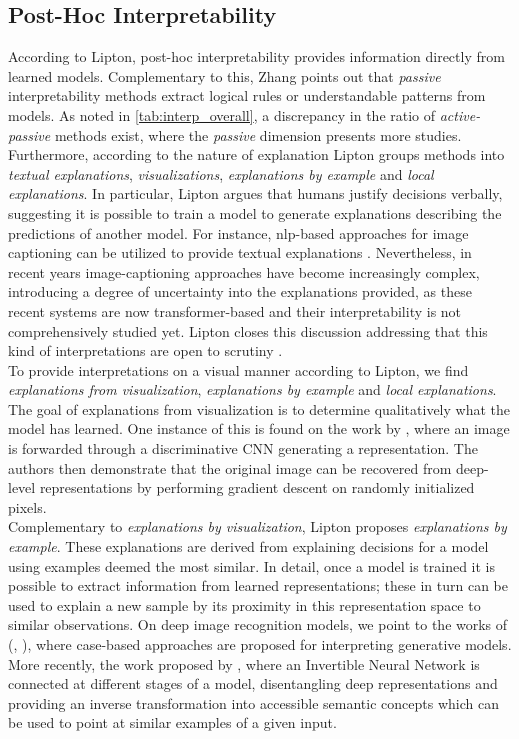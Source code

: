 \subsection{Post-Hoc Interpretability}
\label{rel:sub_post}
According to Lipton, post-hoc interpretability provides information directly from learned models. 
Complementary to this, Zhang points out that \emph{passive} interpretability methods extract 
logical rules or understandable patterns from models. As noted in \autoref{tab:interp_overall}, a 
discrepancy in the ratio of \emph{active-passive} methods exist, where the \emph{passive} 
dimension presents more studies. Furthermore, according to the nature of 
explanation Lipton groups methods into \emph{textual explanations}, \emph{visualizations}, 
\emph{explanations by example} and \emph{local explanations}. In particular, Lipton argues that 
humans justify decisions verbally, suggesting it is possible to train a model to generate 
explanations describing the predictions of another model. For instance, \gls{nlp}-based approaches 
for image captioning can be utilized to provide textual explanations \autocite{mcauley2013hidden}. 
Nevertheless, in recent years image-captioning approaches have become increasingly complex,
introducing a degree of uncertainty into the explanations provided, as these recent systems 
are now transformer-based and their interpretability is not comprehensively studied yet. Lipton 
closes this discussion addressing that this kind of interpretations are open to scrutiny 
\autocite{chang2009reading}.\\

\noindent To provide interpretations on a visual manner according to Lipton, we find 
\emph{explanations from visualization}, \emph{explanations by example} and \emph{local explanations}. 
The goal of explanations from visualization is to determine qualitatively what the model has 
learned. One instance of this is found on the work by \cite{mahendran2015understanding}, where an 
image is forwarded through a discriminative CNN generating a representation. The authors then 
demonstrate that the original image can be recovered from deep-level representations by performing 
gradient descent on randomly initialized pixels.\\

\noindent Complementary to \emph{explanations by visualization}, Lipton proposes \emph{explanations 
by example}. These explanations are derived from explaining decisions for a model using examples 
deemed the most similar. In detail, once a model is trained it is possible to extract information 
from learned representations; these in turn can be used to explain a new sample by its proximity 
in this representation space to similar observations. On deep image recognition models, we point to 
the works of (\cite{kim2014bayesian}, \cite{doshi2015graph}), where case-based approaches are 
proposed for interpreting generative models. More recently, the work proposed by 
\cite{rombach2020making}, where an Invertible Neural Network is connected at different stages of a 
model, disentangling deep representations and providing an inverse transformation into accessible 
semantic concepts which can be used to point at similar examples of a given input.\\

